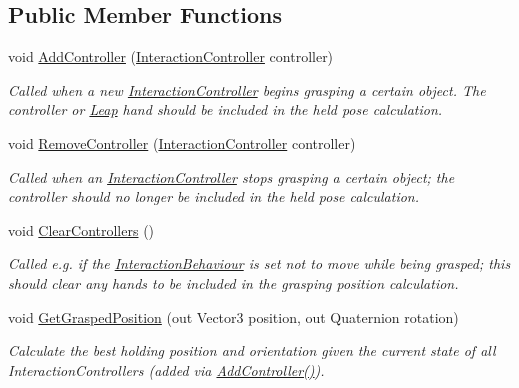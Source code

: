 \subsection*{Public Member Functions}
\begin{DoxyCompactItemize}
\item 
void \mbox{\hyperlink{interface_leap_1_1_unity_1_1_interaction_1_1_i_grasped_pose_handler_ad6b297cf90c878a95ca69901180ab4ce}{Add\+Controller}} (\mbox{\hyperlink{class_leap_1_1_unity_1_1_interaction_1_1_interaction_controller}{Interaction\+Controller}} controller)
\begin{DoxyCompactList}\small\item\em Called when a new \mbox{\hyperlink{class_leap_1_1_unity_1_1_interaction_1_1_interaction_controller}{Interaction\+Controller}} begins grasping a certain object. The controller or \mbox{\hyperlink{namespace_leap_1_1_unity_1_1_leap}{Leap}} hand should be included in the held pose calculation. \end{DoxyCompactList}\item 
void \mbox{\hyperlink{interface_leap_1_1_unity_1_1_interaction_1_1_i_grasped_pose_handler_a7e7305b0089610eced1ee4ca98c3d586}{Remove\+Controller}} (\mbox{\hyperlink{class_leap_1_1_unity_1_1_interaction_1_1_interaction_controller}{Interaction\+Controller}} controller)
\begin{DoxyCompactList}\small\item\em Called when an \mbox{\hyperlink{class_leap_1_1_unity_1_1_interaction_1_1_interaction_controller}{Interaction\+Controller}} stops grasping a certain object; the controller should no longer be included in the held pose calculation. \end{DoxyCompactList}\item 
void \mbox{\hyperlink{interface_leap_1_1_unity_1_1_interaction_1_1_i_grasped_pose_handler_a1f78ffa53ab585a1b283548e4e4381c8}{Clear\+Controllers}} ()
\begin{DoxyCompactList}\small\item\em Called e.\+g. if the \mbox{\hyperlink{class_leap_1_1_unity_1_1_interaction_1_1_interaction_behaviour}{Interaction\+Behaviour}} is set not to move while being grasped; this should clear any hands to be included in the grasping position calculation. \end{DoxyCompactList}\item 
void \mbox{\hyperlink{interface_leap_1_1_unity_1_1_interaction_1_1_i_grasped_pose_handler_a5721a16b0e8e2f8715edfad605931638}{Get\+Grasped\+Position}} (out Vector3 position, out Quaternion rotation)
\begin{DoxyCompactList}\small\item\em Calculate the best holding position and orientation given the current state of all Interaction\+Controllers (added via \mbox{\hyperlink{interface_leap_1_1_unity_1_1_interaction_1_1_i_grasped_pose_handler_ad6b297cf90c878a95ca69901180ab4ce}{Add\+Controller()}}). \end{DoxyCompactList}\end{DoxyCompactItemize}


